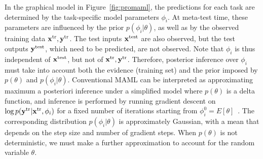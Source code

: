 \documentclass{article}
\begin{document}
In the graphical model in Figure~\ref{fig:promaml}, the predictions for each task are determined by the task-specific model parameters $\phi_i$. At meta-test time, these parameters are influenced by the prior $p(\phi_i | \theta)$, as well as by the observed training data $\mathbf{x}^{\text{tr}}, \mathbf{y}^{\text{tr}}$. The test inputs $\mathbf{x}^{\text{test}}$ are also observed, but the test outputs $\mathbf{y}^{\text{test}}$, which need to be predicted, are not observed. Note that $\phi_i$ is thus independent of $\mathbf{x}^{\text{test}}$, but not of $\mathbf{x}^{\text{tr}}, \mathbf{y}^{\text{tr}}$. Therefore, posterior inference over $\phi_i$ must take into account both the evidence (training set) and the prior imposed by $p(\theta)$ and $p(\phi_i | \theta)$. Conventional MAML can be interpreted as approximating maximum a posteriori inference under a simplified model where $p(\theta)$ is a delta function, and inference is performed by running gradient descent on $\log p(\mathbf{y}^{\text{tr}} | \mathbf{x}^{\text{tr}}, \phi_i)$ for a fixed number of iterations starting from $\phi_i^0 = E[\theta]$~\cite{grant2018recasting}. The corresponding distribution $p(\phi_i | \theta)$ is approximately Gaussian, with a mean that depends on the step size and number of gradient steps. When $p(\theta)$ is not deterministic, we must make a further approximation to account for the random variable $\theta$.
\end{document}
